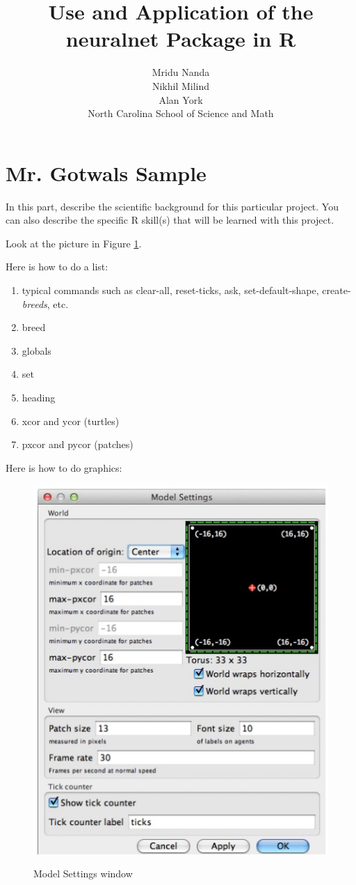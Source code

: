 \documentclass[11pt]{article}
\title{Use and Application of the neuralnet Package in R}
\author{Mridu Nanda \\ Nikhil Milind \\ Alan York \\ North Carolina School of Science and Math}
\begin{document}
\maketitle


\section{Mr. Gotwals Sample}


In this part, describe the scientific background for this particular project.  You can also describe the specific R skill(s) that will be learned with this project.  \cite{boyce}

 Look at the picture in Figure \ref{fig:model}. 

Here is how to do a list:

\begin{enumerate}
\item typical commands such as clear-all, reset-ticks,  ask, set-default-shape, create-\emph{breeds}, etc.
\item  breed
\item globals
\item set
\item heading
\item xcor and ycor (turtles)
\item pxcor and pycor (patches)
\end{enumerate}

Here is how to do graphics:

\begin{figure}[H] %
   \centering
      \caption{Model Settings window}
   \includegraphics[scale=0.5]{model.jpg} 
   \label{fig:model}
\end{figure}
\end{document}
